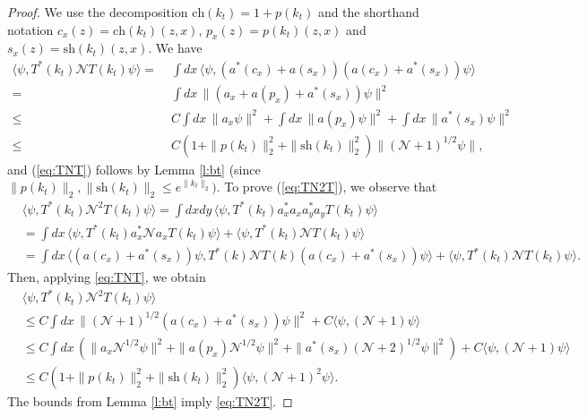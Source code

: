\documentclass[11pt,a4paper]{article}
\newcommand{\N}{\mathcal{N}}
\begin{document}
\begin{proof}
We use the decomposition $\text{ch} (k_t) = 1 + p(k_t)$ and the shorthand notation $c_x(z) = \text{ch} (k_t) (z,x)$, $p_x(z) = p(k_t) (z,x)$ and $s_x(z) = \text{sh} (k_t) (z,x)$. We have
 \[\begin{split} 
  \langle \psi, T^* (k_t)  \N T (k_t) \psi \rangle = \; & \int dx \, \langle  \psi, (a^* (c_x) + a (s_x)) (a (c_x) + a^* (s_x)) \psi \rangle \\ = \; &\int dx \, \| (a_x + a(p_x) + a^*(s_x)) \psi
  \|^2 \\  \leq \; &C  \int dx \, \| a_x \psi \|^2
    + \int dx \, \| a(p_x) \psi \|^2 + \int dx \, \| a^*(s_x) \psi \|^2 \\
    \leq \; &C ( 1 + \| p (k_t) \|_2^2 + \| \text{sh} (k_t) \|_2^2 ) \| (\N + 1)^{1/2}  \psi \|,
      \end{split}\]
and (\ref{eq:TNT}) follows by Lemma \ref{l:bt} (since $\| p (k_t) \|_2, \| \text{sh} (k_t) \|_2 \leq e^{\| k_t \|_2})$. To prove (\ref{eq:TN2T}), we observe that 
\begin{align*}
 & \langle \psi, T^* (k_t) \N^2 T (k_t) \psi \rangle = \int dxdy \, \langle \psi, T^* (k_t)  a_x^* a_x a_y^* a_y T (k_t) \psi \rangle \\
    & = \int dx \, \langle \psi, T^* (k_t)  a_x^* \N a_x T (k_t) \psi \rangle + \langle
    \psi, T^* (k_t)  \N T (k_t) \psi \rangle \\
    & = \int dx \, \langle (a(c_x) + a^*(s_x)) \psi, T^* (k)  \N T (k) (a (c_x)  + a^*(s_x)) \psi \rangle + \langle \psi, T^* (k_t) \N T (k_t) \psi \rangle.
  \end{align*}
  Then, applying \eqref{eq:TNT},  we obtain
  \begin{align*}
    & \langle \psi, T^* (k_t) \N^2 T (k_t) \psi \rangle \\
    & \leq C \int dx \, \| (\N+1)^{1/2} (a (c_x) +
    a^*(s_x)) \psi \|^2 + C \langle \psi, (\N+1) \psi \rangle \\
    & \leq C \int dx \, (\| a_x \N^{1/2} \psi \|^2 + \| a(p_x)
    \N^{1/2} \psi \|^2 + \| a^*(s_x) (\N+2)^{1/2} \psi \|^2 ) + C \langle
    \psi, (\N+1) \psi \rangle \\
    & \leq C(1 + \| p (k_t) \|_{2}^2 + \| \text{sh} (k_t)  \|_{2}^2) \langle \psi, (\N+1)^2
    \psi \rangle.
  \end{align*}
The bounds from Lemma \ref{l:bt} imply \eqref{eq:TN2T}.
\end{proof}
\end{document}
